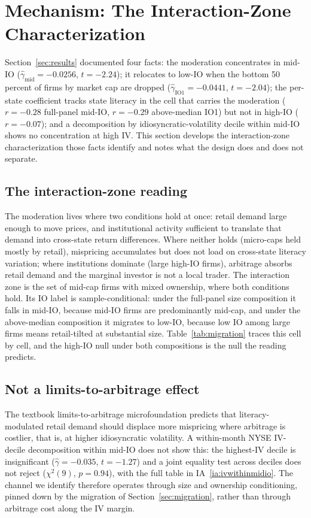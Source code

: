 \section{Mechanism: The Interaction-Zone Characterization}
\label{sec:mechanism}

Section~\ref{sec:results} documented four facts: the moderation concentrates in mid-IO ($\hat\gamma_{\text{mid}} = -0.0256$, $t = -2.24$); it relocates to low-IO when the bottom 50 percent of firms by market cap are dropped ($\hat\gamma_{\text{IO1}} = -0.0441$, $t = -2.04$); the per-state coefficient tracks state literacy in the cell that carries the moderation ($r = -0.28$ full-panel mid-IO, $r = -0.29$ above-median IO1) but not in high-IO ($r = -0.07$); and a decomposition by idiosyncratic-volatility decile within mid-IO shows no concentration at high IV. This section develops the interaction-zone characterization those facts identify and notes what the design does and does not separate.

\subsection{The interaction-zone reading}
\label{sec:zone}

The moderation lives where two conditions hold at once: retail demand large enough to move prices, and institutional activity sufficient to translate that demand into cross-state return differences. Where neither holds (micro-caps held mostly by retail), mispricing accumulates but does not load on cross-state literacy variation; where institutions dominate (large high-IO firms), arbitrage absorbs retail demand and the marginal investor is not a local trader. The interaction zone is the set of mid-cap firms with mixed ownership, where both conditions hold. Its IO label is sample-conditional: under the full-panel size composition it falls in mid-IO, because mid-IO firms are predominantly mid-cap, and under the above-median composition it migrates to low-IO, because low IO among large firms means retail-tilted at substantial size. Table~\ref{tab:migration} traces this cell by cell, and the high-IO null under both compositions is the null the reading predicts.

\subsection{Not a limits-to-arbitrage effect}
\label{sec:mech_iv_decile}

The textbook limits-to-arbitrage microfoundation \citep{shleiferVishny1997, pontiff2006} predicts that literacy-modulated retail demand should displace more mispricing where arbitrage is costlier, that is, at higher idiosyncratic volatility. A within-month NYSE IV-decile decomposition within mid-IO does not show this: the highest-IV decile is insignificant ($\hat\gamma = -0.035$, $t = -1.27$) and a joint equality test across deciles does not reject ($\chi^2(9)$, $p = 0.94$), with the full table in IA~\ref{ia:ivwithinmidio}. The channel we identify therefore operates through size and ownership conditioning, pinned down by the migration of Section~\ref{sec:migration}, rather than through arbitrage cost along the IV margin.

